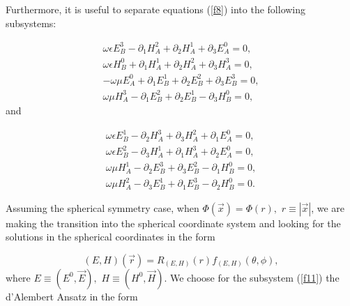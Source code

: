 \documentclass[a4paper,12pt]{article}
\begin{document}
Furthermore, it is useful to separate equations (\ref{f8}) into the
following subsystems:

\begin{equation}
\begin{array}{c}
\omega \epsilon E_B^3-\partial _1H_A^2+\partial _2H_A^1+\partial _3E_A^0=0,
\\
\omega \epsilon H_B^0+\partial _1H_A^1+\partial _2H_A^2+\partial _3H_A^3=0,
\\
-\omega \mu E_A^0+\partial _1E_B^1+\partial _2E_B^2+\partial _3E_B^3=0, \\
\omega \mu H_A^3-\partial _1E_B^2+\partial _2E_B^1-\partial _3H_B^0=0,
\end{array}
\label{f11}
\end{equation}
and

\begin{equation}
\begin{array}{c}
\omega \epsilon E_B^1-\partial _2H_A^3+\partial _3H_A^2+\partial _1E_A^0=0,
\\
\omega \epsilon E_B^2-\partial _3H_A^1+\partial _1H_A^3+\partial _2E_A^0=0,
\\
\omega \mu H_A^1-\partial _2E_B^3+\partial _3E_B^2-\partial _1H_B^0=0, \\
\omega \mu H_A^2-\partial _3E_B^1+\partial _1E_B^3-\partial _2H_B^0=0.
\end{array}
\label{f12}
\end{equation}

Assuming the spherical symmetry case, when $\Phi (\overrightarrow{x})=\Phi
(r),$ $r\equiv \left| \overrightarrow{x}\right| $, we are making the
transition into the spherical coordinate system and looking for the
solutions in the spherical coordinates in the form

\begin{equation}
\left( E,H\right) \left( \overrightarrow{r}\right) =R_{(E,H)}\left( r\right)
f_{(E,H)}\left( \theta ,\phi \right) ,  \label{f13}
\end{equation}
where $E\equiv \left( E^0,\overrightarrow{E}\right) ,$ $H\equiv \left( H^0,%
\overrightarrow{H}\right) $. We choose for the subsystem (\ref{f11}) the
d'Alembert Ansatz in the form
\end{document}
